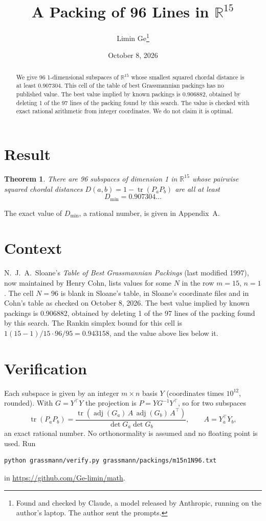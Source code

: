 \documentclass[11pt,a4paper]{article}
\title{A Packing of 96 Lines in $\mathbb{R}^{15}$}
\author{Limin Ge\thanks{Found and checked by Claude, a model released by Anthropic, running on the author's laptop. The author sent the prompts.}}
\date{October 8, 2026}
\newtheorem*{theorem}{Theorem}
\begin{document}
\maketitle
\begin{abstract}
We give 96 1-dimensional subspaces of $\mathbb{R}^{15}$ whose smallest squared chordal distance is at least 0.907304. This cell of the table of best Grassmannian packings has no published value. The best value implied by known packings is 0.906882, obtained by deleting 1 of the 97 lines of the packing found by this search. The value is checked with exact rational arithmetic from integer coordinates. We do not claim it is optimal.
\end{abstract}

\section{Result}
\begin{theorem}
There are 96 subspaces of dimension 1 in $\mathbb{R}^{15}$ whose pairwise squared chordal distances $D(a,b) = 1 - \operatorname{tr}(P_aP_b)$ are all at least
\[ D_{\min} = 0.907304\ldots \]
\end{theorem}
The exact value of $D_{\min}$, a rational number, is given in Appendix~A.


\section{Context}
N.~J.~A.~Sloane's \emph{Table of Best Grassmannian Packings} (last modified 1997), now maintained by Henry Cohn, lists values for some $N$ in the row $m=15$, $n=1$. The cell $N=96$ is blank in Sloane's table, in Sloane's coordinate files and in Cohn's table as checked on October 8, 2026. The best value implied by known packings is 0.906882, obtained by deleting 1 of the 97 lines of the packing found by this search. The Rankin simplex bound for this cell is $1(15-1)/15\cdot 96/95 = 0.943158$, and the value above lies below it.


\section{Verification}
Each subspace is given by an integer $m\times n$ basis $Y$ (coordinates times $10^{12}$, rounded). With $G=Y^\top Y$ the projection is $P=YG^{-1}Y^\top$, so for two subspaces
\[ \operatorname{tr}(P_aP_b)=\frac{\operatorname{tr}(\operatorname{adj}(G_a)\,A\,\operatorname{adj}(G_b)\,A^\top)}{\det G_a\det G_b},\qquad A=Y_a^\top Y_b, \]
an exact rational number. No orthonormality is assumed and no floating point is used. Run
\begin{verbatim}
python grassmann/verify.py grassmann/packings/m15n1N96.txt
\end{verbatim}
in \url{https://github.com/Ge-limin/math}.
\end{document}
